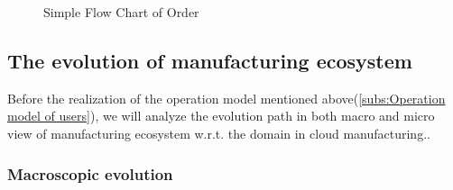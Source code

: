 \begin{figure}[!h]
\centering\small
\resizebox{0.9\textwidth}{!}{}
\caption{Simple Flow Chart of Order}
\label{fig:simpleorderflow}
\end{figure}








\subsection{The evolution of manufacturing ecosystem} %
\label{sub:the_evolution_of_manufacturing_ecosystem}
Before the realization of the operation model mentioned above(\autoref{subs:Operation model of users}), we will analyze the evolution path in both macro and micro view of manufacturing ecosystem w.r.t. the domain in cloud manufacturing..
\subsubsection{Macroscopic evolution} %
\label{ssub:macroscopic_evolution}

